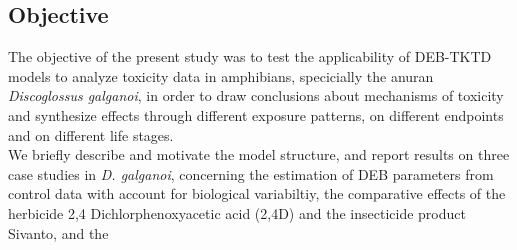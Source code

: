 \subsection{Objective}
%
The objective of the present study was to test the applicability of DEB-TKTD models to 
analyze toxicity data in amphibians, specicially the anuran \textit{Discoglossus galganoi}, 
in order to draw conclusions about mechanisms of toxicity and synthesize effects through different exposure patterns, 
on different endpoints and on different life stages. \\ 
We briefly describe and motivate the model structure, and report results on three case studies in \textit{D. galganoi}, 
concerning the estimation of DEB parameters from control data with account for biological variabiltiy,
the comparative effects of the herbicide 2,4 Dichlorphenoxyacetic acid (2,4D) and the insecticide product Sivanto,
and the 
